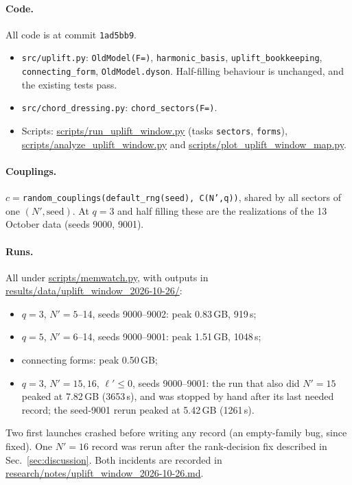 \documentclass[11pt]{article}
\newcommand{\Np}{N'}
\newcommand{\lp}{\ell'}
\theoremstyle{plain}
\theoremstyle{remark}
\numberwithin{equation}{section}
\begin{document}
\paragraph{Code.} All code is at commit \texttt{1ad5bb9}.
\begin{itemize}\itemsep1pt
\item \texttt{src/uplift.py}: \texttt{OldModel(F=)}, \texttt{harmonic\_basis}, \texttt{uplift\_bookkeeping},
\texttt{connecting\_form}, \texttt{OldModel.dyson}. Half-filling behaviour is unchanged, and the existing tests pass.
\item \texttt{src/chord\_dressing.py}: \texttt{chord\_sectors(F=)}.
\item Scripts: \url{scripts/run_uplift_window.py} (tasks \texttt{sectors}, \texttt{forms}),
\url{scripts/analyze_uplift_window.py} and \url{scripts/plot_uplift_window_map.py}.
\end{itemize}

\paragraph{Couplings.} $c=$\texttt{random\_couplings(default\_rng(seed), C(N',q))}, shared by all sectors of one
$(\Np,\text{seed})$. At $q=3$ and half filling these are the realizations of the 13 October data (seeds 9000, 9001).

\paragraph{Runs.} All under \url{scripts/memwatch.py}, with outputs in
\url{results/data/uplift_window_2026-10-26/}:
\begin{itemize}\itemsep1pt
\item $q=3$, $\Np=5$--14, seeds 9000--9002: peak 0.83\,GB, 919\,s;
\item $q=5$, $\Np=6$--14, seeds 9000--9001: peak 1.51\,GB, 1048\,s;
\item connecting forms: peak 0.50\,GB;
\item $q=3$, $\Np=15,16$, $\lp\le0$, seeds 9000--9001: the run that also did $\Np=15$ peaked at 7.82\,GB (3653\,s), and was stopped by hand after its last needed record; the seed-9001 rerun peaked at 5.42\,GB (1261\,s).
\end{itemize}
Two first launches crashed before writing any record (an empty-family bug, since fixed). One $\Np=16$ record was
rerun after the rank-decision fix described in Sec.~\ref{sec:discussion}. Both incidents are recorded in
\url{research/notes/uplift_window_2026-10-26.md}.
\end{document}

